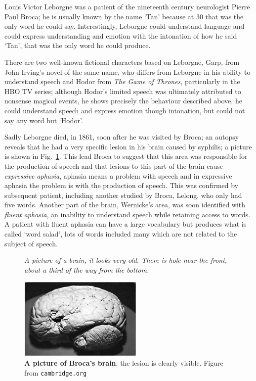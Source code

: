 \documentclass[12pt]{article}
\begin{document}
Louis Victor Leborgne was a patient of the nineteenth century
neurologist Pierre Paul Broca; he is usually known by the name `Tan'
because at 30 that was the only word he could say. Interestingly,
Leborgne could understand language and could express understanding and
emotion with the intonation of how he said `Tan', that was the only
word he could produce.

There are two well-known fictional characters based on Leborgne, Garp,
from John Irving's novel of the same name, who differs from Leborgne
in his ability to understand speech and Hodor from \textsl{The Game of
  Thrones}, particularly in the HBO TV series; although Hodor's
limited speech was ultimately attributed to nonsense magical events,
he shows precisely the behaviour described above, he could understand
speech and express emotion though intonation, but could not say any
word but `Hodor'.

Sadly Leborgne died, in 1861, soon after he was visited by Broca; an
autopsy reveals that he had a very specific lesion in his brain caused
by syphilis; a picture is shown in Fig.~\ref{fig_broca}. This lead
Broca to suggest that this area was responsible for the production of
speech and that lesions to this part of the brain cause
\textsl{expressive aphasia}, aphasia means a problem with speech and
in expressive aphasia the problem is with the production of
speech. This was confirmed by subsequent patient, including another
studied by Broca, Lelong, who only had five words. Another part of the
brain, Wernicke's area, was soon identified with \textsl{fluent
  aphasia}, an inability to understand speech while retaining access
to words. A patient with fluent aphasia can have a large vocabulary
but produces what is called `word salad', lots of words included many
which are not related to the subject of speech.

\begin{figure}[tbhp]
{\textsl{A picture of a brain, it looks very old. There is hole near the front, about a third of the way from the bottom.}}
{
  \begin{center}
  \includegraphics[width=6cm]{broca.png}
  \end{center}
  }
  \caption{\textbf{A picture of Broca's brain}; the lesion is clearly visible. Figure from
    \texttt{cambridge.org}\label{fig_broca}}
\end{figure}
\end{document}

